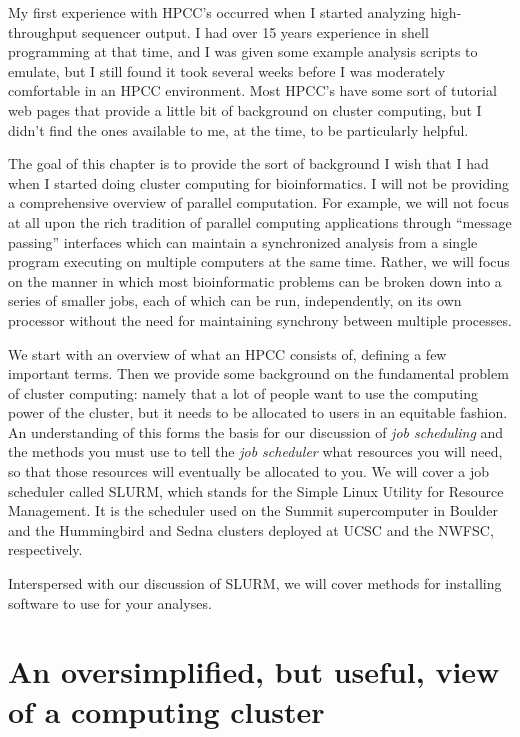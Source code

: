 \documentclass[]{krantz}
\begin{document}
My first experience with HPCC's occurred when I started analyzing
high-throughput sequencer output. I had over 15 years experience in shell
programming at that time, and I was given some example analysis scripts to emulate, but I still
found it took several weeks before I was moderately comfortable in an HPCC environment. Most
HPCC's have some sort of tutorial web pages that provide a little bit of background
on cluster computing, but I didn't find the ones available to me, at the time, to
be particularly helpful.

The goal of this chapter is to provide the sort of background I wish that I had
when I started doing cluster computing for bioinformatics. I will not be providing
a comprehensive overview of parallel computation. For example, we will not focus at all
upon the rich tradition of parallel computing applications through ``message passing'' interfaces which
can maintain a synchronized analysis from a single program executing
on multiple computers at the same time. Rather, we will focus on the manner in which
most bioinformatic problems can be broken down into a series of smaller jobs,
each of which can be run, independently, on its own processor without the
need for maintaining synchrony between multiple processes.

We start with an overview of what an HPCC consists of, defining a few important
terms. Then we provide some background on the fundamental problem of cluster
computing: namely that a lot of people want to use the computing power of the cluster,
but it needs to be allocated to users in an equitable fashion. An understanding of this
forms the basis for our discussion of \emph{job scheduling} and the methods you must
use to tell the \emph{job scheduler} what resources you will need, so that those resources
will eventually be allocated to you. We will cover a job scheduler called SLURM, which
stands for the Simple Linux Utility for Resource Management. It is the scheduler used
on the Summit supercomputer in Boulder and the Hummingbird and Sedna clusters deployed
at UCSC and the NWFSC, respectively.

Interspersed with our discussion of SLURM, we will cover
methods for installing software to use for your analyses.

\hypertarget{an-oversimplified-but-useful-view-of-a-computing-cluster}{%
\section{An oversimplified, but useful, view of a computing cluster}\label{an-oversimplified-but-useful-view-of-a-computing-cluster}}
\end{document}
